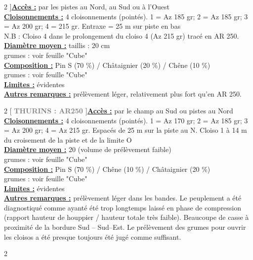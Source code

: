 \documentclass[a4paper,openany]{book}\usepackage[]{graphicx}\usepackage[]{color}
\begin{document}
\begin{multicols}{2}
]\noindent\textbf{\underline{Accès :}} par les pistes au Nord, au Sud ou à l'Ouest\vspace{0.1cm} \\\noindent\textbf{\underline{Cloisonnements :}} 4 cloisonnements (pointés). 1 = Az 185 gr; 2 = Az 185 gr; 3 = Az 200 gr; 4 = 215 gr. Entraxe = 25 m sur piste en bas \\ N.B : Cloiso 4 dans le prolongement du cloiso 4 (Az 215 gr) tracé en AR 250.\vspace{0.1cm} \\\noindent\textbf{\underline{Diamètre moyen :}} taillis  : 20 cm \\ grumes : voir feuille "Cube"\vspace{0.1cm} \\\noindent\textbf{\underline{Composition :}} Pin S (70 \%) / Châtaignier (20 \%) / Chêne (10 \%) \\ grumes : voir feuille "Cube"\vspace{0.1cm} \\\noindent\textbf{\underline{Limites :}} évidentes\vspace{0.1cm} \\\noindent\textbf{\underline{Autres remarques :}} prélèvement léger, relativement plus fort qu'en AR 250.\vspace{0.1cm} \\\end{multicols}\begin{multicols}{2}
[
\textbf{\textcolor{gray}{
\large THURINS : AR250
}}
]\noindent\textbf{\underline{Accès :}} par le champ au Sud ou pistes au Nord\vspace{0.1cm} \\\noindent\textbf{\underline{Cloisonnements :}} 4 cloisonnements (pointés). 1 = Az 170 gr; 2 = Az 185 gr; 3 = Az 200 gr; 4 = Az 215 gr. Espacés de 25 m sur la piste au N. Cloiso 1 à 14 m du croisement de la piste et de la limite O\vspace{0.1cm} \\\noindent\textbf{\underline{Diamètre moyen :}} 20 (volume de prélèvement faible) \\ grumes : voir feuille "Cube"\vspace{0.1cm} \\\noindent\textbf{\underline{Composition :}} Pin S (70 \%) / Chêne (10 \%) / Châtaignier (20 \%) \\ grumes : voir feuille "Cube"\vspace{0.1cm} \\\noindent\textbf{\underline{Limites :}} évidentes\vspace{0.1cm} \\\noindent\textbf{\underline{Autres remarques :}} prélèvement léger dans les bandes. Le peuplement a été diagnostiqué comme ayanté été trop longtemps laissé en phase de compression (rapport hauteur de houppier / hauteur totale très faible). Beaucoupe de casse à proximité de la bordure Sud -- Sud--Est. Le prélèvement des grumes pour ouvrir les cloisos a été presque toujours été jugé comme suffisant.\vspace{0.1cm} \\\end{multicols}\begin{multicols}{2}

\end{multicols}
\end{document}
